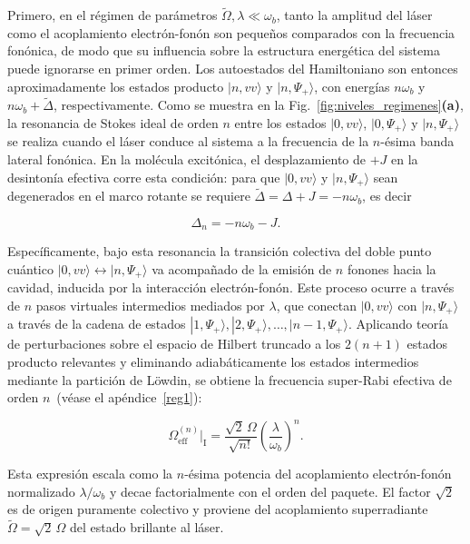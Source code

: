 Primero, en el régimen de parámetros $\widetilde\Omega, \lambda \ll \omega_b$, tanto la amplitud del láser como el acoplamiento electrón-fonón son pequeños comparados con la frecuencia fonónica, de modo que su influencia sobre la estructura energética del sistema puede ignorarse en primer orden. Los autoestados del Hamiltoniano son entonces aproximadamente los estados producto $|n, vv\rangle$ y $|n, \Psi_+\rangle$, con energías $n\omega_b$ y $n\omega_b + \widetilde\Delta$, respectivamente. Como se muestra en la Fig.~\ref{fig:niveles_regimenes}\textbf{(a)}, la resonancia de Stokes ideal de orden $n$ entre los estados $|0, vv\rangle$, $|0, \Psi_+\rangle$ y $|n, \Psi_+\rangle$ se realiza cuando el láser conduce al sistema a la frecuencia de la $n$-ésima banda lateral fonónica. En la molécula excitónica, el desplazamiento de $+J$ en la desintonía efectiva corre esta condición: para que $|0,vv\rangle$ y $|n,\Psi_+\rangle$ sean degenerados en el marco rotante se requiere $\widetilde\Delta = \Delta + J = -n\omega_b$, es decir

\begin{equation}
	\Delta_n = -n\omega_b - J.
	\label{eq:res_I_texto}
\end{equation}

Específicamente, bajo esta resonancia la transición colectiva del doble punto cuántico $|0,vv\rangle \leftrightarrow |n,\Psi_+\rangle$ va acompañado de la emisión de $n$ fonones hacia la cavidad, inducida por la interacción electrón-fonón. Este proceso ocurre a través de $n$ pasos virtuales intermedios mediados por $\lambda$, que conectan $|0,vv\rangle$ con $|n,\Psi_+\rangle$ a través de la cadena de estados $|1,\Psi_+\rangle, |2,\Psi_+\rangle, \ldots, |n-1,\Psi_+\rangle$. Aplicando teoría de perturbaciones sobre el espacio de Hilbert truncado a los $2(n+1)$ estados producto relevantes y eliminando adiabáticamente los estados intermedios mediante la partición de Löwdin, se obtiene la frecuencia super-Rabi efectiva de orden $n$~(véase el apéndice~\ref{reg1}):

\begin{equation}
	\Omega_\mathrm{eff}^{(n)}\Big|_\mathrm{I}
	= \frac{\sqrt{2}\,\Omega}{\sqrt{n!}}
	\left(\frac{\lambda}{\omega_b}\right)^{\!n}.
	\label{eq:Oeff_I_texto}
\end{equation}

Esta expresión escala como la $n$-ésima potencia del acoplamiento electrón-fonón normalizado $\lambda/\omega_b$ y decae factorialmente con el orden del paquete. El factor $\sqrt{2}$ es de origen puramente colectivo y proviene del acoplamiento superradiante $\widetilde\Omega = \sqrt{2}\,\Omega$ del estado brillante al láser. 

